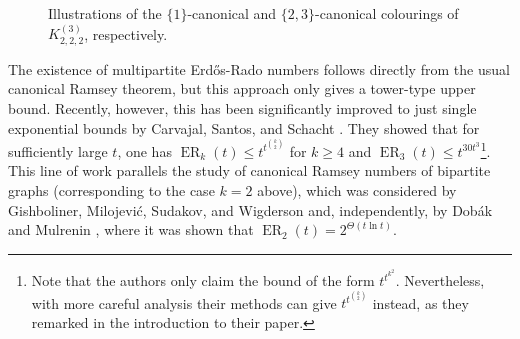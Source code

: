 \documentclass[10pt,a4paper]{article}
\theoremstyle{plain}
\theoremstyle{definition}
\newcommand{\erado}[2]{\operatorname{ER}_{#1}(#2)}
\newcommand{\tricmplt}[1]{K^{(3)}_{#1,#1,#1}}
\begin{document}
\begin{figure}[ht]
\begin{minipage}{0.3\textwidth}
    \end{minipage}
    \caption{Illustrations of the $\{1\}$-canonical and $\{2,3\}$-canonical colourings of $\tricmplt{2}$, respectively.}
    \label{fig-k222}
\end{figure}

The existence of multipartite Erd\H{o}s-Rado numbers follows directly from the usual canonical Ramsey theorem, but this approach only gives a tower-type upper bound. Recently, however, this has been significantly improved to just single exponential bounds by Carvajal, Santos, and Schacht \cite{carvajal2024canonical}. They showed that for sufficiently large $t$, one has $\erado{k}{t}\le t^{t^{\binom{k}{2}}}$ for $k\ge 4$ and $\erado{3}{t}\le t^{30t^3}$\footnote{Note that the authors only claim the bound of the form $t^{t^{k^2}}$. Nevertheless, with more careful analysis their methods can give $t^{t^{\binom{k}{2}}}$ instead, as they remarked in the introduction to their paper.}. This line of work parallels the study of canonical Ramsey numbers of bipartite graphs (corresponding to the case $k=2$ above), which was considered by Gishboliner, Milojevi\'c, Sudakov, and Wigderson \cite{gishboliner2025canonical} and, independently, by Dob\'ak and Mulrenin \cite{dobak2026sharp}, where it was shown that $\erado{2}{t}=2^{\Theta(t\ln t)}$.
\end{document}
